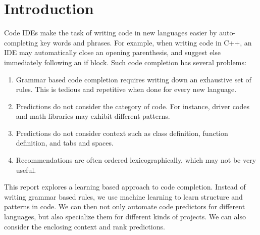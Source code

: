 \section{Introduction}
\label{sec:intro}

\noindent
Code IDEs
make the task of writing
code in new languages easier by auto-completing key words and phrases.
For example, when writing code in C++, an IDE may automatically close an
opening parenthesis, and suggest else immediately following an if block.
Such code completion has several problems:
\begin{enumerate}[topsep=0pt,itemsep=-1ex,partopsep=1ex,parsep=1ex]
  \item Grammar based code completion requires writing down an exhaustive set
    of rules. This is tedious and repetitive when done for every new language.
  \item Predictions do not consider the category of code. For instance, driver
    codes and math libraries may exhibit different patterns.
  \item Predictions do not consider context such as class
    definition, function definition, and tabs and spaces.
  \item Recommendations are often ordered lexicographically, which may not be
  very useful.
\end{enumerate}

\noindent
This report explores a learning based approach to code completion. Instead of
writing grammar based rules, we use machine learning to learn structure and
patterns in code. We can then not only automate code predictors for different
languages, but also specialize them for different kinds of projects.
We can also consider the enclosing context and rank predictions.

